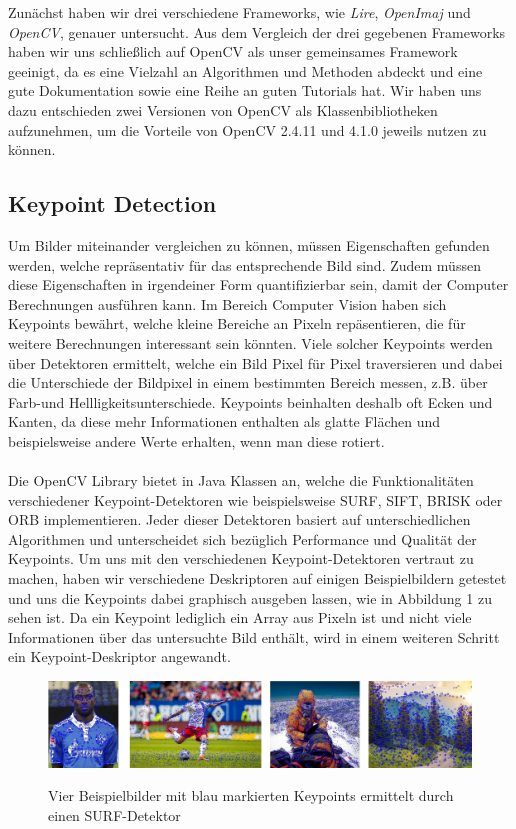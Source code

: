 \documentclass{scrartcl}
\begin{document}
Zunächst haben wir drei verschiedene Frameworks, wie \textit{Lire}, \textit{OpenImaj} und \textit{OpenCV}, genauer untersucht. Aus dem Vergleich der drei gegebenen Frameworks haben wir uns schließlich auf OpenCV als unser gemeinsames Framework geeinigt, da es eine Vielzahl an Algorithmen und Methoden abdeckt und eine gute Dokumentation sowie eine Reihe an guten Tutorials hat. Wir haben uns dazu entschieden zwei Versionen von OpenCV als Klassenbibliotheken aufzunehmen, um die Vorteile von OpenCV 2.4.11 und 4.1.0 jeweils nutzen zu können.

\subsection{Keypoint Detection}
Um Bilder miteinander vergleichen zu können, müssen Eigenschaften gefunden werden, welche repräsentativ für das entsprechende Bild sind. Zudem müssen diese Eigenschaften in irgendeiner Form quantifizierbar sein, damit der Computer Berechnungen ausführen kann. Im Bereich Computer Vision haben sich Keypoints bewährt, welche kleine Bereiche an Pixeln repäsentieren, die für weitere Berechnungen interessant sein könnten. Viele solcher Keypoints werden über Detektoren ermittelt, welche ein Bild Pixel für Pixel traversieren und dabei die Unterschiede der Bildpixel in einem bestimmten Bereich messen, z.B. über Farb-und Hellligkeitsunterschiede. Keypoints beinhalten deshalb oft Ecken und Kanten, da diese mehr Informationen enthalten als glatte Flächen und beispielsweise andere Werte erhalten, wenn man diese rotiert.
\\
\\
Die OpenCV Library bietet in Java Klassen an, welche die Funktionalitäten verschiedener Keypoint-Detektoren wie beispielsweise SURF, SIFT, BRISK oder ORB implementieren. Jeder dieser Detektoren basiert auf unterschiedlichen Algorithmen und unterscheidet sich bezüglich Performance und Qualität der Keypoints. Um uns mit den verschiedenen Keypoint-Detektoren vertraut zu machen, haben wir verschiedene Deskriptoren auf einigen Beispielbildern getestet und uns die Keypoints dabei graphisch ausgeben lassen, wie in Abbildung 1 zu sehen ist. Da ein Keypoint lediglich ein Array aus Pixeln ist und nicht viele Informationen über das untersuchte Bild enthält, wird in einem weiteren Schritt ein Keypoint-Deskriptor angewandt. 
\begin{figure}[h]
\begin{center}
\includegraphics[scale=0.72]{keypoints.jpg}
\label{fig:keypoints}
\caption{Vier Beispielbilder mit blau markierten Keypoints ermittelt durch einen SURF-Detektor}
\end{center}
\end{figure}
\end{document}

